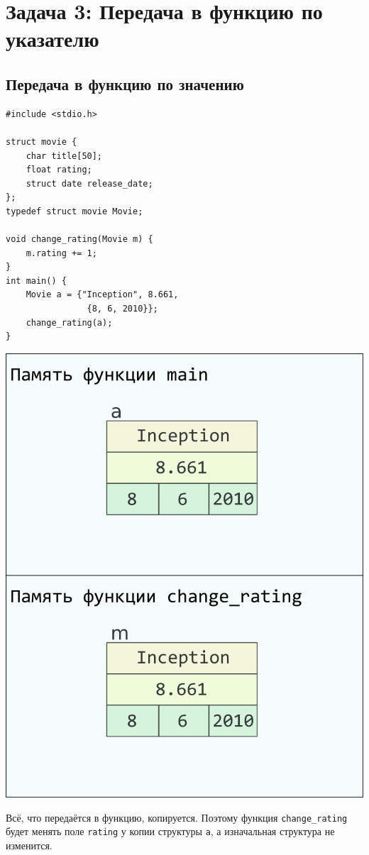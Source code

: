 \documentclass{article}
\begin{document}
\newpage
\section*{Задача 3: Передача в функцию по указателю}
\subsection*{Передача в функцию по значению}
\begin{multicols}{2}
\begin{lstlisting}
#include <stdio.h>

struct movie {
    char title[50];
    float rating;
    struct date release_date;
};
typedef struct movie Movie;

void change_rating(Movie m) {
    m.rating += 1;
}
int main() {
    Movie a = {"Inception", 8.661, 
                {8, 6, 2010}};
    change_rating(a);
}
\end{lstlisting}
\columnbreak
\begin{center}
\includegraphics[scale=0.86]{../images/pointer_schemes/function_by_value.png}
\end{center}
\end{multicols}
Всё, что передаётся в функцию, копируется. Поэтому функция \texttt{change\_rating} будет менять
поле \texttt{rating} у копии структуры \texttt{a}, а изначальная структура не изменится.
\end{document}
